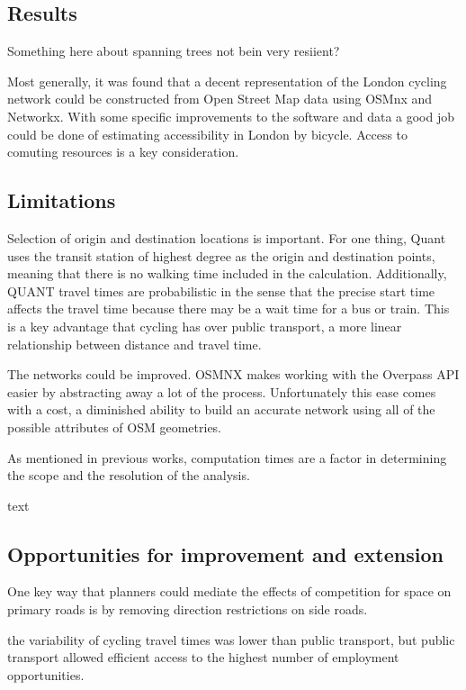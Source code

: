 \subsection{Results}

Something here about spanning trees not bein very resiient? 

Most generally, it was found that a decent representation of the London cycling network could be constructed from Open Street Map data using OSMnx and Networkx. With some specific improvements to the software and data a good job could be done of estimating accessibility in London by bicycle. Access to comuting resources is a key consideration.

\subsection{Limitations}

Selection of origin and destination locations is important. For one thing, Quant uses the transit station of highest degree as the origin and destination points, meaning that there is no walking time included in the calculation. Additionally, QUANT travel times are probabilistic in the sense that the precise start time affects the travel time because there may be a wait time for a bus or train. This is a key advantage that cycling has over public transport, a more linear relationship between distance and travel time. 

The networks could be improved. OSMNX makes working with the Overpass API easier by abstracting away a lot of the process. Unfortunately this ease comes with a cost, a diminished ability to build an accurate network using all of the possible attributes of OSM geometries. 

As mentioned in previous works, computation times are a factor in determining the scope and the resolution of the analysis. 

text

\subsection{Opportunities for improvement and extension}


One key way that planners could mediate the effects of competition for space on primary roads is by removing direction restrictions on side roads. 

the variability of cycling travel times was lower than public transport, but public transport allowed efficient access to the highest number of employment opportunities. 


